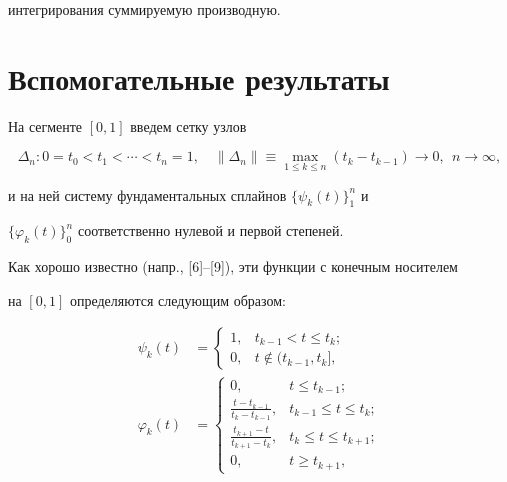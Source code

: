 интегрирования суммируемую производную.








\section{Вспомогательные результаты}





На сегменте $[0,1]$ введем сетку узлов


\begin{equation}


\Delta_n: 0=t_0<t_1<\dotsb <t_n=1,\quad


\|\Delta_n\|\equiv \max_{1\leq k\leq n}(t_k-t_{k-1})\to 0,


\ \ n\to \infty,


\end{equation}


и на ней систему фундаментальных сплайнов $\{\psi_k(t)\}_1^n$ и


$\{\varphi_k(t)\}_0^n$ соответственно нулевой и первой степеней.


Как хорошо известно (напр., [6]--[9]), эти функции с конечным носителем


на $[0,1]$ определяются следующим образом:


\begin{align*}


\psi_k(t)&=


\begin{cases}


1, & t_{k-1}< t\leq t_k;\\


0, & t\notin (t_{k-1},t_k],


\end{cases}


\\


%


\varphi_k(t)&=


\begin{cases}


0, & t\leq t_{k-1};\\


\frac{t-t_{k-1}}{t_k-t_{k-1}}, & t_{k-1} \leq t\leq t_k;\\


\frac{t_{k+1}-t}{t_{k+1}-t_{k}}, & t_{k} \leq t\leq t_{k+1};\\


0, & t\geq t_{k+1},


\end{cases}


\end{align*}


